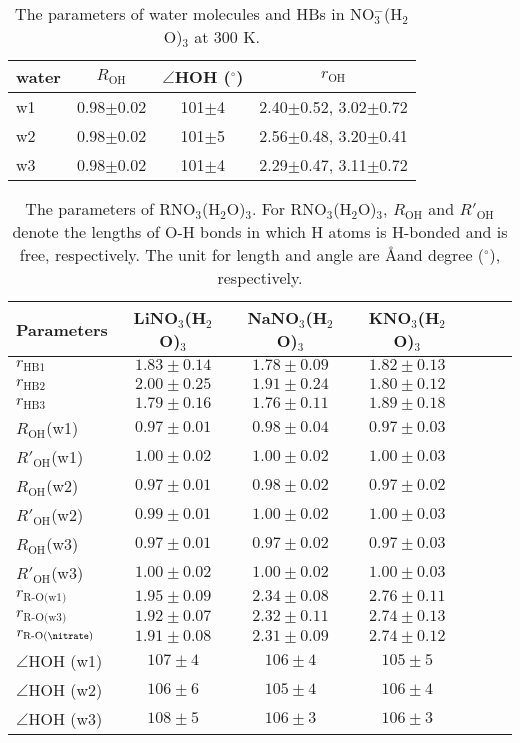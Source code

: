 %
\begin{table}[!htbp]
\centering
\caption{\label{tab:3w_nitrate}%
The parameters of water molecules and HBs in NO$_3^-$(H$_2$O)$_3$ at 300 K.}
\begin{tabular}{lccc}
water &$R_\text{OH}$ &$\angle$HOH ($^\circ$) & $r_\text{OH}$ \\
\hline
w1 &0.98$\pm$0.02 &101$\pm$4 & 2.40$\pm$0.52, 3.02$\pm$0.72 \\
w2 &0.98$\pm$0.02 &101$\pm$5 & 2.56$\pm$0.48, 3.20$\pm$0.41 \\
w3 &0.98$\pm$0.02 &101$\pm$4 & 2.29$\pm$0.47, 3.11$\pm$0.72
\end{tabular}
\end{table}
%
\begin{table}[!htbp]
\centering
\caption{\label{tab:table_rnitrate_3w}%
The parameters of RNO$_3$(H$_2$O)$_3$. For RNO$_3$(H$_2$O)$_3$, $R_\text{OH}$ and $R'_\text{OH}$ 
  denote the lengths of O-H bonds in which H atoms is H-bonded and is free, respectively.
  The unit for length and angle are \AA and degree ($^\circ$), respectively.
  }
\begin{tabular}{l*{4}ccc}
Parameters & LiNO$_3$(H$_2$O)$_3$& NaNO$_3$(H$_2$O)$_3$ & KNO$_3$(H$_2$O)$_3$\\
\hline
$r_\text{HB1}$ & $1.83\pm0.14$ & $1.78\pm0.09$ & $1.82\pm0.13$\\
$r_\text{HB2}$ & $2.00\pm0.25$ & $1.91\pm0.24$ & $1.80\pm0.12$\\
$r_\text{HB3}$ &$1.79\pm0.16$ & $1.76\pm0.11$ & $1.89\pm0.18$\\
$R_\text{OH}$(w1) &$0.97\pm0.01$ &$0.98\pm0.04$ &$0.97\pm0.03$ \\
$R'_\text{OH}$(w1) &$1.00\pm0.02$ &$1.00\pm0.02$ & $1.00\pm0.03$ \\
$R_\text{OH} $(w2) &$0.97\pm0.01$ &$0.98\pm0.02$ &$0.97\pm0.02$ \\ 
$R'_\text{OH}$(w2) &$0.99\pm0.01$ &$1.00\pm0.02$ & $1.00\pm0.03$ \\
$R_\text{OH}$(w3) &$0.97\pm0.01$ & $0.97\pm0.02$&$0.97\pm0.03$ \\
$R'_\text{OH}$(w3) &$1.00\pm0.02$ &$1.00\pm0.02$ & $1.00\pm0.03$ \\
$r_\text{R-O(w1)}$ & $1.95\pm0.09$ & $2.34\pm0.08$ & $2.76\pm0.11$\\
$r_\text{R-O(w3)}$ & $1.92\pm0.07$ & $2.32\pm0.11$ & $2.74\pm0.13$\\
$r_\text{R-O(\nitrate)}$ & $1.91\pm0.08$ & $2.31\pm0.09$ & $2.74\pm0.12$ \\
$\angle$HOH (w1) &$107\pm4$ & $106\pm4$ &$105\pm5$ \\
$\angle$HOH (w2) &$106\pm6$ & $105\pm4$ &$106\pm4$ \\
$\angle$HOH (w3) &$108\pm5$ & $106\pm3$ &$106\pm3$ 
\end{tabular}
\end{table}


